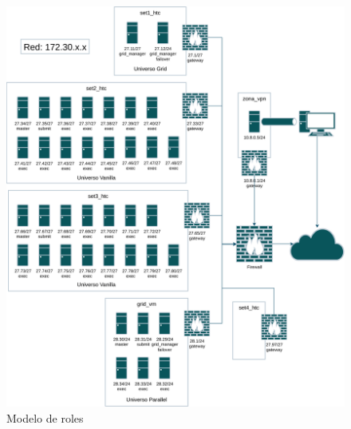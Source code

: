 \begin{figure}[H]
	\centering
	\includegraphics[scale=0.088]{tablas-images/personalizado/Diagramas HTCondor-Roles.drawio.png}
	\caption{Modelo de roles}
    \label{fig:Roles}
\end{figure}